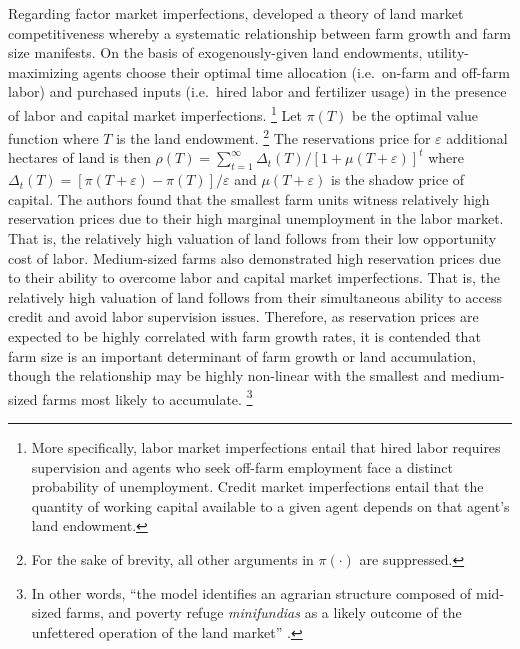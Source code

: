 \documentclass[english]{article}
\begin{document}
Regarding factor market imperfections, \citet{carter1993} developed a theory 
of land market competitiveness whereby a systematic relationship between 
farm growth and farm size manifests.
On the basis of exogenously-given land endowments, utility-maximizing 
agents choose their optimal time allocation 
(i.e.\ on-farm and off-farm labor) and purchased inputs 
(i.e.\ hired labor and fertilizer usage) in the presence of labor and 
capital market imperfections.%
\footnote{More specifically, labor market imperfections entail that hired 
labor requires supervision and agents who seek off-farm employment face a 
distinct probability of unemployment. 
Credit market imperfections entail that the quantity of working capital 
available to a given agent depends on that agent's land endowment.}
Let $\pi(T)$ be the optimal value function where $T$ is the land endowment.%
\footnote{For the sake of brevity, all other arguments in $\pi(\cdot)$ are 
suppressed.}
The reservations price for $\varepsilon$ additional hectares of land is then 
$\rho(T) = \sum_{t=1}^{\infty} \Delta_t(T)/[1 + \mu(T + \varepsilon)]^t$
where $\Delta_t(T) = [\pi(T + \varepsilon) - \pi(T)]/\varepsilon $ and 
$\mu(T + \varepsilon)$ is the shadow price of capital.
The authors found that the smallest farm units witness relatively high 
reservation prices due to their high marginal unemployment in the labor 
market. 
That is, the relatively high valuation of land follows from their low 
opportunity cost of labor.
Medium-sized farms also demonstrated high reservation prices due to
their ability to overcome labor and capital market imperfections. 
That is, the relatively high valuation of land follows from their simultaneous 
ability to access credit and avoid labor supervision issues.
Therefore, as reservation prices are expected to be highly correlated with farm 
growth rates, it is contended that farm size is an important determinant of 
farm growth or land accumulation, though the relationship may be highly 
non-linear with the smallest and medium-sized farms most likely to 
accumulate.%
\footnote{In other words, ``the model identifies an agrarian structure 
composed of mid-sized farms, and poverty refuge \emph{minifundias} as a 
likely outcome of the unfettered operation of the land market'' 
\citep[pg.\ 1097]{carter1993}.}
\end{document}
